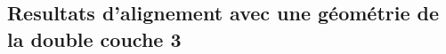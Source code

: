 \begin{appendices}
%   
%   

\chapter{Resultats d'alignement avec une g\'eom\'etrie de la double couche 3}
\label{resultats_align_DL3}


\end{appendices}
